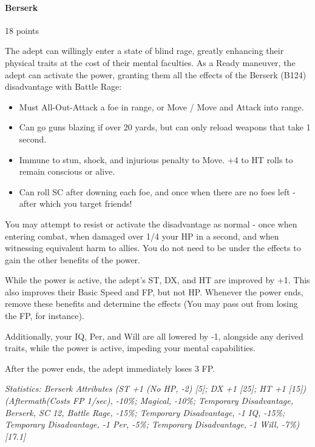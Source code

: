 \begin{multicols*}{3}
	
	\paragraph{Berserk}
	\begin{flushright}
		18 points
	\end{flushright}

	The adept can willingly enter a state of blind rage, greatly enhancing their physical traits at the cost of their mental faculties. As a Ready maneuver, the adept can activate the power, granting them all the effects of the Berserk (B124) disadvantage with Battle Rage:
	
	\begin{itemize}
		\itemsep 0pt
		\item Must All-Out-Attack a foe in range, or Move / Move and Attack into range.
		\item Can go guns blazing if over 20 yards, but can only reload weapons that take 1 second.
		\item Immune to stun, shock, and injurious penalty to Move. +4 to HT rolls to remain conscious or alive.
		\item Can roll SC after downing each foe, and once when there are no foes left - after which you target friends!
	\end{itemize}	

	You may attempt to resist or activate the disadvantage as normal - once when entering combat, when damaged over 1/4 your HP in a second, and when witnessing equivalent harm to allies. You do not need to be under the effects to gain the other benefits of the power.

	While the power is active, the adept's ST, DX, and HT are improved by +1. This also improves their Basic Speed and FP, but not HP. Whenever the power ends, remove these benefits and determine the effects (You may pass out from losing the FP, for instance).
	
	Additionally, your IQ, Per, and Will are all lowered by -1, alongside any derived traits, while the power is active, impeding your mental capabilities.
	
	After the power ends, the adept immediately loses 3 FP.
	
	\textcolor{OliveGreen}{\textit{Statistics: Berserk Attributes (ST +1 (No HP, -2) [5]; DX +1 [25]; HT +1 [15]) (Aftermath(Costs FP 1/sec), -10\%; Magical, -10\%; Temporary Disadvantage, Berserk, SC 12, Battle Rage, -15\%; Temporary Disadvantage, -1 IQ, -15\%; Temporary Disadvantage, -1 Per, -5\%; Temporary Disadvantage, -1 Will, -7\%) [17.1] }}
			

\end{multicols*}
